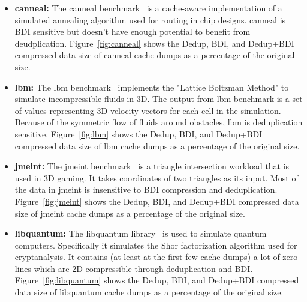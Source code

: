 \begin{itemize}
    \item \textbf{canneal:} The canneal benchmark~\cite{parsec} is a cache-aware implementation of a simulated annealing algorithm used for routing in chip designs. canneal is BDI sensitive but doesn't have enough potential to benefit from deudplication. Figure~\ref{fig:canneal} shows the Dedup, BDI, and Dedup+BDI compressed data size of canneal cache dumps as a percentage of the original size.
    \item \textbf{lbm:} The lbm benchmark~\cite{spec} implements the "Lattice Boltzman Method" to simulate incompressible fluids in 3D. The output from lbm benchmark is a set of values representing 3D velocity vectors for each cell in the simulation. Because of the symmetric flow of fluids around obstacles, lbm is deduplication sensitive. Figure~\ref{fig:lbm} shows the Dedup, BDI, and Dedup+BDI compressed data size of lbm cache dumps as a percentage of the original size.
    \item \textbf{jmeint:} The jmeint benchmark~\cite{axbench} is a triangle intersection workload that is used in 3D gaming. It takes coordinates of two triangles as its input. Most of the data in jmeint is insensitive to BDI compression and deduplication. Figure~\ref{fig:jmeint} shows the Dedup, BDI, and Dedup+BDI compressed data size of jmeint cache dumps as a percentage of the original size.
    \item \textbf{libquantum:} The libquantum library~\cite{spec} is used to simulate quantum computers. Specifically it simulates the Shor factorization algorithm used for cryptanalysis. It contains (at least at the first few cache dumps) a lot of zero lines which are 2D compressible through deduplication and BDI. Figure~\ref{fig:libquantum} shows the Dedup, BDI, and Dedup+BDI compressed data size of libquantum cache dumps as a percentage of the original size.
\end{itemize}
